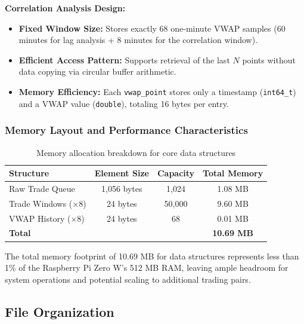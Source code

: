 \documentclass[12pt,a4paper]{article}
\begin{document}
\textbf{Correlation Analysis Design:}

\begin{itemize}

    \item \textbf{Fixed Window Size:} Stores exactly 68 one-minute VWAP samples (60 minutes for lag analysis + 8 minutes for the correlation window).
    \item \textbf{Efficient Access Pattern:} Supports retrieval of the last $N$ points without data copying via circular buffer arithmetic.
    \item \textbf{Memory Efficiency:} Each \texttt{vwap\_point} stores only a timestamp (\texttt{int64\_t}) and a VWAP value (\texttt{double}), totaling 16 bytes per entry.

\end{itemize}

\vspace{1mm}
\subsubsection{Memory Layout and Performance Characteristics}

\begin{table}[h]
\centering
\begin{tabular}{@{}lccc@{}}
\toprule
\textbf{Structure} & \textbf{Element Size} & \textbf{Capacity} & \textbf{Total Memory} \\
\midrule
Raw Trade Queue & 1,056 bytes & 1,024 & 1.08 MB \\
Trade Windows ($\times$8) & 24 bytes & 50,000 & 9.60 MB \\
VWAP History ($\times$8) & 24 bytes & 68 & 0.01 MB \\
\midrule
\textbf{Total} & & & \textbf{10.69 MB} \\
\bottomrule
\end{tabular}
\caption{Memory allocation breakdown for core data structures}
\end{table}

The total memory footprint of 10.69 MB for data structures represents less than 1\% of the Raspberry Pi Zero W's 512 MB RAM, leaving ample headroom for system operations and potential scaling to additional trading pairs.    

\subsection{File Organization}
\end{document}

